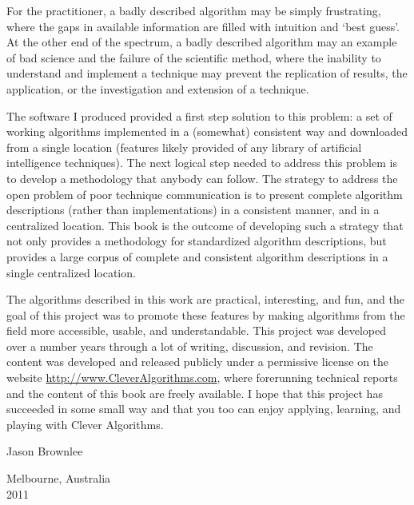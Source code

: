 For the practitioner, a badly described algorithm may be simply frustrating, where the gaps in available information are filled with intuition and `best guess'. At the other end of the spectrum, a badly described algorithm may an example of bad science and the failure of the scientific method, where the inability to understand and implement a technique may prevent the replication of results, the application, or the investigation and extension of a technique. 

The software I produced provided a first step solution to this problem: a set of working algorithms implemented in a (somewhat) consistent way and downloaded from a single location (features likely provided of any library of artificial intelligence techniques). The next logical step needed to address this problem is to develop a methodology that anybody can follow. The strategy to address the open problem of poor technique communication is to present complete algorithm descriptions (rather than implementations) in a consistent manner, and in a centralized location.
This book is the outcome of developing such a strategy that not only provides a methodology for standardized algorithm descriptions, but provides a large corpus of complete and consistent algorithm descriptions in a single centralized location. 

The algorithms described in this work are practical, interesting, and fun, and the goal of this project was to promote these features by making algorithms from the field more accessible, usable, and understandable.
This project was developed over a number years through a lot of writing, discussion, and revision. The content was developed and released publicly under a permissive license on the website \url{http://www.CleverAlgorithms.com}, where forerunning technical reports and the content of this book are freely available.
I hope that this project has succeeded in some small way and that you too can enjoy applying, learning, and playing with Clever Algorithms. 

\begin{flushright}
\vspace{1in}
Jason Brownlee
\end{flushright}

\begin{flushleft}
\vspace{0.2in}
Melbourne, Australia \\
2011
\end{flushleft}
